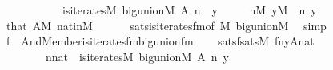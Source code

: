 \begin{isabellebody}
\ \ \ \ \ \ \ \ \ \ \ is{\isacharunderscore}{\kern0pt}iterates{\isacharparenleft}{\kern0pt}{\isacharhash}{\kern0pt}{\isacharhash}{\kern0pt}M{\isacharcomma}{\kern0pt}\ big{\isacharunderscore}{\kern0pt}union{\isacharparenleft}{\kern0pt}{\isacharhash}{\kern0pt}{\isacharhash}{\kern0pt}M{\isacharparenright}{\kern0pt}{\isacharcomma}{\kern0pt}\ A{\isacharcomma}{\kern0pt}\ n\ {\isacharcomma}{\kern0pt}\ y{\isacharparenright}{\kern0pt}{\isachardoublequoteclose}\isanewline
\ \ \ \ \ {\isachardoublequoteopen}n{\isasymin}M{\isachardoublequoteclose}\ {\isachardoublequoteopen}y{\isasymin}M{\isachardoublequoteclose}\ \ n\ y\isanewline
\ \ \ \ \isamarkupfalse%
\ that\ {\isacartoucheopen}A{\isasymin}M{\isacartoucheclose}\ nat{\isacharunderscore}{\kern0pt}in{\isacharunderscore}{\kern0pt}M\isanewline
\ \ \ \ \ \ sats{\isacharunderscore}{\kern0pt}is{\isacharunderscore}{\kern0pt}iterates{\isacharunderscore}{\kern0pt}fm{\isacharbrackleft}{\kern0pt}of\ M\ {\isachardoublequoteopen}big{\isacharunderscore}{\kern0pt}union{\isacharparenleft}{\kern0pt}{\isacharhash}{\kern0pt}{\isacharhash}{\kern0pt}M{\isacharparenright}{\kern0pt}{\isachardoublequoteclose}{\isacharbrackright}{\kern0pt}\ \isamarkupfalse%
\ simp\isanewline
\ \ \isamarkupfalse%
\ {\isacharquery}{\kern0pt}f\ {\isacharequal}{\kern0pt}\ {\isachardoublequoteopen}And{\isacharparenleft}{\kern0pt}Member{\isacharparenleft}{\kern0pt}{}{\isacharcomma}{\kern0pt}{}{\isacharparenright}{\kern0pt}{\isacharcomma}{\kern0pt}is{\isacharunderscore}{\kern0pt}iterates{\isacharunderscore}{\kern0pt}fm{\isacharparenleft}{\kern0pt}big{\isacharunderscore}{\kern0pt}union{\isacharunderscore}{\kern0pt}fm{\isacharparenleft}{\kern0pt}{}{\isacharcomma}{\kern0pt}{}{\isacharparenright}{\kern0pt}{\isacharcomma}{\kern0pt}{}{\isacharcomma}{\kern0pt}{}{\isacharcomma}{\kern0pt}{}{\isacharparenright}{\kern0pt}{\isacharparenright}{\kern0pt}{\isachardoublequoteclose}\isanewline
\ \ \isamarkupfalse%
\ satsf{\isacharcolon}{\kern0pt}{\isachardoublequoteopen}sats{\isacharparenleft}{\kern0pt}M{\isacharcomma}{\kern0pt}\ {\isacharquery}{\kern0pt}f{\isacharcomma}{\kern0pt}{\isacharbrackleft}{\kern0pt}n{\isacharcomma}{\kern0pt}y{\isacharcomma}{\kern0pt}A{\isacharcomma}{\kern0pt}nat{\isacharbrackright}{\kern0pt}\ {\isacharparenright}{\kern0pt}\ {\isasymlongleftrightarrow}\isanewline
\ \ \ \ \ \ \ \ n{\isasymin}nat\ {\isacharampersand}{\kern0pt}\ is{\isacharunderscore}{\kern0pt}iterates{\isacharparenleft}{\kern0pt}{\isacharhash}{\kern0pt}{\isacharhash}{\kern0pt}M{\isacharcomma}{\kern0pt}\ big{\isacharunderscore}{\kern0pt}union{\isacharparenleft}{\kern0pt}{\isacharhash}{\kern0pt}{\isacharhash}{\kern0pt}M{\isacharparenright}{\kern0pt}{\isacharcomma}{\kern0pt}\ A{\isacharcomma}{\kern0pt}\ n{\isacharcomma}{\kern0pt}\ y{\isacharparenright}{\kern0pt}{\isachardoublequoteclose}\isanewline

\end{isabellebody}
